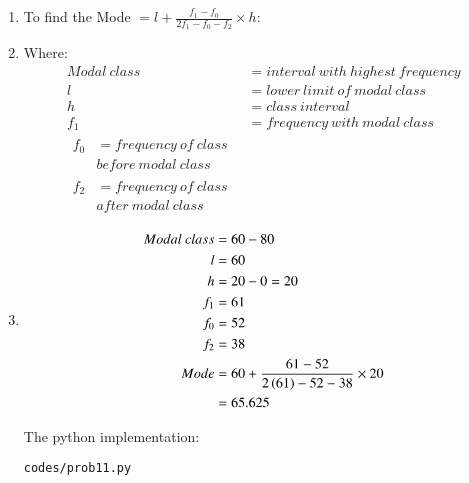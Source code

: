 \renewcommand{\theequation}{\theenumi}
\begin{enumerate}

\item To find the Mode $ = l + \frac{f_1 - f_0}{2f_1 - f_0 - f_2} \times h $:

\item Where:
\begin{align*}
Modal\ class &= interval\ with\ highest\ frequency\\
l &= lower\ limit\ of\ modal\ class\\
h &= class\ interval\\
f_1 &= frequency\ with\ modal\ class\\
\begin{split}
f_0 &= frequency\ of\ class\ \\ &before\ modal\ class
\end{split}\\
\begin{split}
f_2 &= frequency\ of\ class\ \\ &after\ modal\ class
\end{split}
\end{align*}

\item
\begin{align}
Modal\ class &= 60 - 80\\ 
l &= 60\\
h &= 20-0 = 20\\
f_1 &= 61\\
f_0 &= 52\\
f_2 &= 38\\
Mode &= 60 + \frac{61-52}{2\left(61\right) - 52 - 38} \times 20\\
&= 65.625
\end{align}

The python implementation:
\begin{lstlisting}
codes/prob11.py
\end{lstlisting}


\end{enumerate}